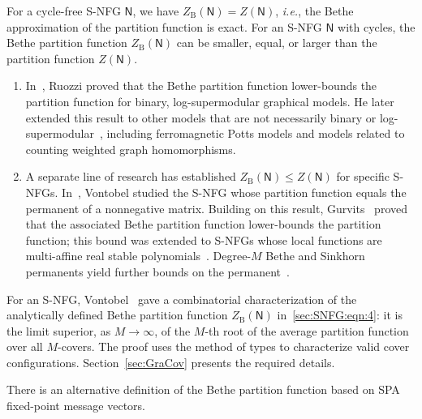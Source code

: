 \documentclass[journal]{IEEEtran}
\newcommand{\add}[1]{{\color{black}#1}}
\newcommand{\ZB}{Z_{ \mathrm{B} }}
\newcommand{\graphN}{ \mathsf{N} }
\newcommand*{\ie}{\textit{i.e.}}
\begin{document}
For a cycle-free S-NFG $\graphN$, we have $\ZB(\graphN) = Z(\graphN)$, \ie,
the Bethe approximation of the partition function is exact. For an S-NFG
$\graphN$ with cycles, the Bethe partition function $\ZB(\graphN)$ can be
smaller, equal, or larger than the partition function \add{$Z(\graphN)$}.
\begin{enumerate}

  \item In~\cite[Corollary 4.2]{Ruozzi2012}, Ruozzi proved that the Bethe
        partition function lower-bounds the partition function for binary,
        log-supermodular graphical models. He later extended this result to other
        models that are not necessarily binary or
        log-supermodular~\cite{Ruozzi2013}\add{, including ferromagnetic Potts
          models and models related to counting weighted graph homomorphisms}.

  \item A separate line of research has established
        $\ZB(\graphN) \leq Z(\graphN)$ for specific S-NFGs.
        In~\cite{Vontobel2013a}, Vontobel studied the S-NFG whose partition function
        equals the permanent of a \add{nonnegative} matrix. \add{Building on this
          result, Gurvits~\cite[Theorem 2.2]{Gurvits2011}} proved that the
        associated Bethe partition function lower-bounds the partition
        function\add{; this bound was extended to S-NFGs whose local functions are
          multi-affine real stable
          polynomials~\cite{Straszak2019,Anari2021,Huang2024a}. Degree-$M$ Bethe and
          Sinkhorn permanents yield further bounds on the
          permanent~\cite{Huang2023}}.

\end{enumerate}

For an S-NFG, Vontobel~\cite{Vontobel2013} gave a combinatorial
characterization of the analytically defined Bethe partition function
$\ZB(\graphN)$ in~\eqref{sec:SNFG:eqn:4}: it is the limit superior, as
$M\to\infty$, of the $M$-th root of the average partition function over all
$M$-covers. The proof uses the method of types to characterize valid cover
configurations. Section~\ref{sec:GraCov} presents the required details.

There is an alternative definition of the Bethe partition function based on SPA fixed-point
message vectors.
\end{document}
